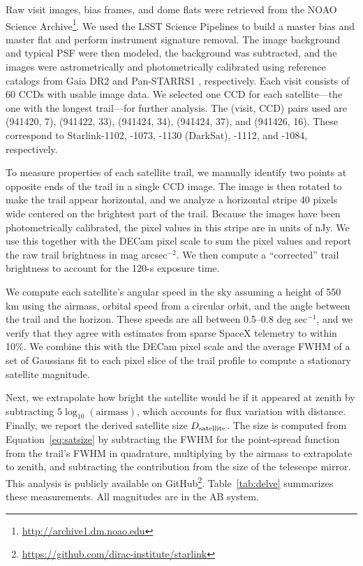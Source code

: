 \documentclass[twocolumn,trackchanges]{aastex63}
\begin{document}
Raw visit images, bias frames, and dome flats were retrieved from the NOAO Science Archive\footnote{\url{http://archive1.dm.noao.edu}}. We used the LSST Science Pipelines \citep{2019ASPC..523..521B} to build a master bias and master flat and perform instrument signature removal. The image background and typical PSF were then modeled, the background was subtracted, and the images were astrometrically and photometrically calibrated using reference catalogs from Gaia DR2 \citep{2018A&A...616A...1G} and Pan-STARRS1 \citep{2016arXiv161205243F}, respectively. Each visit consists of 60 CCDs with usable image data. We selected one CCD for each satellite---the one with the longest trail---for further analysis. The (visit, CCD) pairs used are (941420, 7), (941422, 33), (941424, 34), (941424, 37), and (941426, 16). These correspond to Starlink-1102, -1073, -1130 (DarkSat), -1112, and -1084, respectively.

To measure properties of each satellite trail, we manually identify two points at opposite ends of the trail in a single CCD image. The image is then rotated to make the trail appear horizontal, and we analyze a horizontal stripe 40 pixels wide centered on the brightest part of the trail. Because the images have been photometrically calibrated, the pixel values in this stripe are in units of nJy. We use this together with the DECam pixel scale to sum the pixel values and report the raw trail brightness in mag arcsec$^{-2}$. We then compute a ``corrected'' trail brightness to account for the 120-s exposure time.

We compute each satellite's angular speed in the sky assuming a height of 550 km using the airmass, orbital speed from a circular orbit, and the angle between the trail and the horizon. These speeds are all between 0.5--0.8 deg sec$^{-1}$, and we verify that they agree with estimates from sparse SpaceX telemetry to within 10\%. We combine this with the DECam pixel scale and the average FWHM of a set of Gaussians fit to each pixel slice of the trail profile to compute a stationary satellite magnitude.

Next, we extrapolate how bright the satellite would be if it appeared at zenith by subtracting $5 \log_{10} (\textrm{airmass})$, which accounts for flux variation with distance. Finally, we report the derived satellite size $D_{\rm satellite}$. The size is computed from Equation~\ref{eq:satsize} by subtracting the FWHM for the point-spread function from the trail's FWHM in quadrature, multiplying by the airmass to extrapolate to zenith, and subtracting the contribution from the size of the telescope mirror. This analysis is publicly available on GitHub\footnote{\url{https://github.com/dirac-institute/starlink}}. Table~\ref{tab:delve} summarizes these measurements. All magnitudes are in the AB system.
\end{document}
